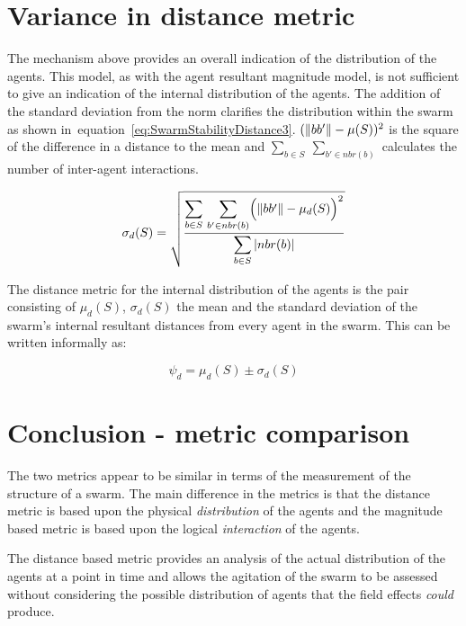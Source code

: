 \section{Variance in distance metric}\label{Section:VarianceInDistance}
The mechanism above provides an overall indication of the distribution of the agents. This model, as with the agent resultant magnitude model, is not sufficient to give an indication of the internal distribution of the agents. The addition of the standard deviation from the norm clarifies the distribution within the swarm as shown in~equation~\ref{eq:SwarmStabilityDistance3}. $(\Vert{bb'}\Vert - \mu(S))^2$ is the square of the difference in a distance to the mean and $\sum_{b \in S}~\sum_{b' \in nbr(b)}$ calculates the number of inter-agent interactions.

\begin{equation}
\label{eq:SwarmStabilityDistance3}
\sigma_d(S) = \sqrt{\frac{\mathlarger{\sum_{b \in S}}~\mathlarger{\sum_{b' \in nbr(b)}}\Big(\magn{bb'} - \mu_d(S)\Big)^2}{\mathlarger{\sum_{b \in S}\card{nbr(b)}}}}
\end{equation}

The distance metric for the internal distribution of the agents is the pair consisting of $\mu_d(S)$, $\sigma_d(S)$ the mean and the standard deviation of the swarm's internal resultant distances from every agent in the swarm. This can be written informally as:

\begin{equation}
\label{eq:SwarmPotentialMagnitude2}
\psi_d = \mu_d(S)\pm \sigma_d(S)
\end{equation}

\section{Conclusion - metric comparison\label{metric:MagnitudeDistanceComparison}}
The two metrics appear to be similar in terms of the measurement of the structure of a swarm. The main difference in the metrics is that the distance metric is based upon the physical \textit{distribution} of the agents and the magnitude based metric is based upon the logical \textit{interaction} of the agents.

The distance based metric provides an analysis of the actual distribution of the agents at a point in time and allows the agitation of the swarm to be assessed without considering the possible distribution of agents that the field effects \textit{could} produce.

